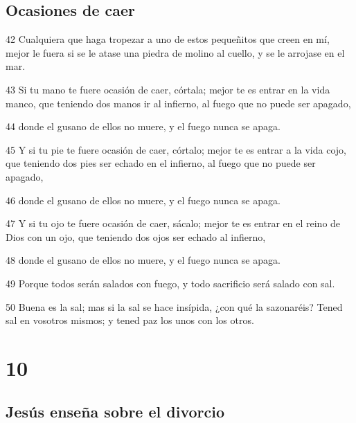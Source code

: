 \section*{Ocasiones de caer}

\par 42 Cualquiera que haga tropezar a uno de estos pequeñitos que creen en mí, mejor le fuera si se le atase una piedra de molino al cuello, y se le arrojase en el mar.
\par 43 Si tu mano te fuere ocasión de caer, córtala; mejor te es entrar en la vida manco, que teniendo dos manos ir al infierno, al fuego que no puede ser apagado,
\par 44 donde el gusano de ellos no muere, y el fuego nunca se apaga.
\par 45 Y si tu pie te fuere ocasión de caer, córtalo; mejor te es entrar a la vida cojo, que teniendo dos pies ser echado en el infierno, al fuego que no puede ser apagado,
\par 46 donde el gusano de ellos no muere, y el fuego nunca se apaga.
\par 47 Y si tu ojo te fuere ocasión de caer, sácalo; mejor te es entrar en el reino de Dios con un ojo, que teniendo dos ojos ser echado al infierno,
\par 48 donde el gusano de ellos no muere, y el fuego nunca se apaga.
\par 49 Porque todos serán salados con fuego, y todo sacrificio será salado con sal.
\par 50 Buena es la sal; mas si la sal se hace insípida, ¿con qué la sazonaréis? Tened sal en vosotros mismos; y tened paz los unos con los otros.

\chapter{10}

\section*{Jesús enseña sobre el divorcio}

